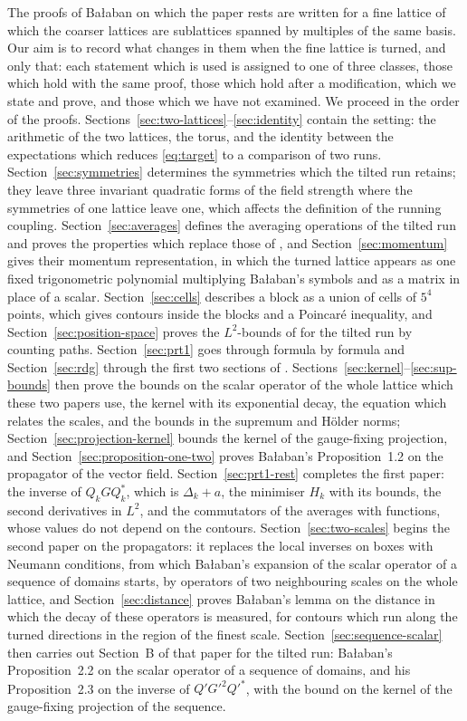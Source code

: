 \documentclass[11pt]{preprint}
\numberwithin{equation}{section}
\theoremstyle{definition}
\theoremstyle{remark}
\theoremstyle{plain}
\begin{document}
The proofs of Ba{\l}aban on which the paper rests are written for a fine lattice of which the coarser lattices are sublattices spanned by multiples of the same basis. Our aim is to record what changes in them when the fine lattice is turned, and only that: each statement which is used is assigned to one of three classes, those which hold with the same proof, those which hold after a modification, which we state and prove, and those which we have not examined. We proceed in the order of the proofs. Sections~\ref{sec:two-lattices}--\ref{sec:identity} contain the setting: the arithmetic of the two lattices, the torus, and the identity between the expectations which reduces \eqref{eq:target} to a comparison of two runs. Section~\ref{sec:symmetries} determines the symmetries which the tilted run retains; they leave three invariant quadratic forms of the field strength where the symmetries of one lattice leave one, which affects the definition of the running coupling. Section~\ref{sec:averages} defines the averaging operations of the tilted run and proves the properties which replace those of \cite[Sections~A and B]{BalabanPRT1}, and Section~\ref{sec:momentum} gives their momentum representation, in which the turned lattice appears as one fixed trigonometric polynomial multiplying Ba{\l}aban's symbols and as a matrix in place of a scalar. Section~\ref{sec:cells} describes a block as a union of cells of $5^4$ points, which gives contours inside the blocks and a Poincar\'e inequality, and Section~\ref{sec:position-space} proves the $L^2$-bounds of \cite{BalabanPRT1} for the tilted run by counting paths. Section~\ref{sec:prt1} goes through \cite{BalabanPRT1} formula by formula and Section~\ref{sec:rdg} through the first two sections of \cite{BalabanRDG}. Sections~\ref{sec:kernel}--\ref{sec:sup-bounds} then prove the bounds on the scalar operator of the whole lattice which these two papers use, the kernel with its exponential decay, the equation which relates the scales, and the bounds in the supremum and H\"older norms; Section~\ref{sec:projection-kernel} bounds the kernel of the gauge-fixing projection, and Section~\ref{sec:proposition-one-two} proves Ba{\l}aban's Proposition~1.2 on the propagator of the vector field. Section~\ref{sec:prt1-rest} completes the first paper: the inverse of $Q_kGQ_k^*$, which is $\Delta_k + a$, the minimiser $H_k$ with its bounds, the second derivatives in $L^2$, and the commutators of the averages with functions, whose values do not depend on the contours. Section~\ref{sec:two-scales} begins the second paper on the propagators: it replaces the local inverses on boxes with Neumann conditions, from which Ba{\l}aban's expansion of the scalar operator of a sequence of domains starts, by operators of two neighbouring scales on the whole lattice, and Section~\ref{sec:distance} proves Ba{\l}aban's lemma on the distance in which the decay of these operators is measured, for contours which run along the turned directions in the region of the finest scale. Section~\ref{sec:sequence-scalar} then carries out Section~B of that paper for the tilted run: Ba{\l}aban's Proposition~2.2 on the scalar operator of a sequence of domains, and his Proposition~2.3 on the inverse of $Q'G'^2Q'^*$, with the bound on the kernel of the gauge-fixing projection of the sequence. 
\end{document}
